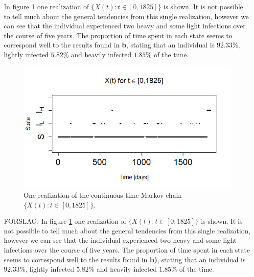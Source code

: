 In figure \ref{1realiz5yr} one realization of $\{X(t): t \in [0,1825]\}$ is shown. It is not possible to tell much about the general tendencies from this single realization, however we can see that the individual experienced two heavy and some light infections over the course of five years. The proportion of time spent in each state seems to correspond well to the results found in \textbf{b}, stating that an individual is  $92.33\%$, lightly infected $5.82\%$ and heavily infected $1.85\%$ of the time. 

\begin{figure}
    \centering
    \includegraphics[width=130mm]{1real5yr.png}
    \caption{One realization of the continuous-time Markov chain $\{X(t):t \in [0, 1825]\}$.}
    \label{1realiz5yr}
\end{figure}


FORSLAG: In figure \ref{1realiz5yr} one realization of $\{X(t): t \in [0,1825]\}$ is shown. It is not possible to tell much about the general tendencies from this single realization, however we can see that the individual experienced two heavy and some light infections over the course of five years. The proportion of time spent in each state seems to correspond well to the results found in \textbf{b)}, stating that an individual is  $92.33\%$, lightly infected $5.82\%$ and heavily infected $1.85\%$ of the time. 


